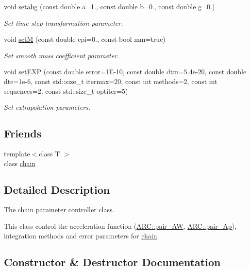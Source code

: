 \begin{DoxyCompactItemize}
void \hyperlink{classARC_1_1chainpars_a37f8af288217cbfc61a3593e21976d06}{setabg} (const double a=1., const double b=0., const double g=0.)
\begin{DoxyCompactList}\small\item\em Set time step transformation parameter. \end{DoxyCompactList}\item 
void \hyperlink{classARC_1_1chainpars_a184e18fe97349573348e887940a82948}{setM} (const double epi=0., const bool mm=true)
\begin{DoxyCompactList}\small\item\em Set smooth mass coefficient parameter. \end{DoxyCompactList}\item 
void \hyperlink{classARC_1_1chainpars_a5ead29e9b2005ba1933821deb96a5876}{set\+E\+XP} (const double error=1\+E-\/10, const double dtm=5.\+4e-\/20, const double dte=1e-\/6, const std\+::size\+\_\+t itermax=20, const int methods=2, const int sequences=2, const std\+::size\+\_\+t optiter=5)
\begin{DoxyCompactList}\small\item\em Set extrapolation parameters. \end{DoxyCompactList}\end{DoxyCompactItemize}
\subsection*{Friends}
\begin{DoxyCompactItemize}
\item 
{\footnotesize template$<$class T $>$ }\\class \hyperlink{classARC_1_1chainpars_a498fbb4337b9878a5f0044996e4a2489}{chain}
\end{DoxyCompactItemize}


\subsection{Detailed Description}
The chain parameter controller class. 

This class control the acceleration function (\hyperlink{namespaceARC_adbfc7c72ce3d25363148027db0641abf}{A\+R\+C\+::pair\+\_\+\+AW}, \hyperlink{namespaceARC_a819446c4644b3a3af7ef11574d0b55e0}{A\+R\+C\+::pair\+\_\+\+Ap}), integration methods and error parameters for \hyperlink{classARC_1_1chain}{chain}. 

\subsection{Constructor \& Destructor Documentation}
\hypertarget{classARC_1_1chainpars_a2019a609d85e2b801f306ac8c7f268ab}{}\label{classARC_1_1chainpars_a2019a609d85e2b801f306ac8c7f268ab} 
